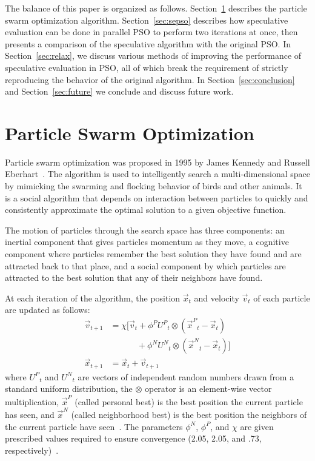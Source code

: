 \documentclass[journal,letterpaper]{IEEEtran}
\renewcommand{\sec}[1]{Section~\ref{sec:#1}}
\providecommand{\pers}{\ensuremath{P}}
\providecommand{\neigh}{\ensuremath{N}}
\providecommand{\nURand}{\ensuremath{U^\neigh}}
\providecommand{\pURand}{\ensuremath{U^\pers}}
\providecommand{\ppos}{\ensuremath{\Vec{x}}}
\providecommand{\pvel}{\ensuremath{\Vec{v}}}
\providecommand{\nbest}{\ensuremath{\Vec{x}^\neigh}}
\providecommand{\pbest}{\ensuremath{\Vec{x}^\pers}}
\providecommand{\constriction}{\ensuremath{\chi}}
\providecommand{\ncoeff}{\ensuremath{\phi^\neigh}}
\providecommand{\pcoeff}{\ensuremath{\phi^\pers}}
\begin{document}
The balance of this paper is organized as follows. \sec{pso} describes the
particle swarm optimization algorithm.  \sec{sepso} describes how speculative
evaluation can be done in parallel PSO to perform two iterations at once, then
presents a comparison of the speculative algorithm with the original PSO.  In
\sec{relax}, we discuss various methods of improving the performance of
speculative evaluation in PSO, all of which break the requirement of strictly
reproducing the behavior of the original algorithm.  In \sec{conclusion} and
\sec{future} we conclude and discuss future work.

\section{Particle Swarm Optimization}
\label{sec:pso}

Particle swarm optimization was proposed in 1995 by James Kennedy and Russell
Eberhart~\cite{kennedy-1995-particle-swarm-optimization}.  The algorithm is used to intelligently search
a multi-dimensional space by mimicking the swarming and flocking behavior of
birds and other animals. It is a social algorithm that depends on interaction
between particles to quickly and consistently approximate the optimal solution
to a given objective function.

The motion of particles through the search space has three components: an
inertial component that gives particles momentum as they move, a cognitive
component where particles remember the best solution they have found and are
attracted back to that place, and a social component by which particles are
attracted to the best solution that any of their neighbors have found.

At each iteration of the algorithm, the position $\ppos_t$ and velocity
$\pvel_t$ of each particle are updated as follows:
\begin{align}
\nonumber
	\pvel_{t+1} &=
		\constriction \bigl[ \pvel_t
			+ \pcoeff\pURand_{t}\otimes(\pbest_{t} - \ppos_{t}) \\
\label{eq:velupdate}
			& \quad \quad \quad \, + \ncoeff\nURand_{t}\otimes(\nbest_{t} - \ppos_{t})
		\bigr] \\
\label{eq:posupdate}
	\ppos_{t+1} &= \ppos_{t} + \pvel_{t+1}
\end{align}
where \( \pURand_{t} \) and \( \nURand_{t} \) are vectors of independent random
numbers drawn from a standard uniform distribution, the \( \otimes \) operator
is an element-wise vector multiplication, $\pbest$ (called personal best) is
the best position the current particle has seen, and $\nbest$ (called
neighborhood best) is the best position the neighbors of the current particle
have seen~\cite{bratton-2007-defining-a-standard-for-pso}.  The parameters \( \ncoeff \), \( \pcoeff \),
and \( \constriction \) are given prescribed values required to ensure
convergence (2.05, 2.05, and .73, respectively)~\cite{clerc-2002-constricted-pso}. 
\end{document}
